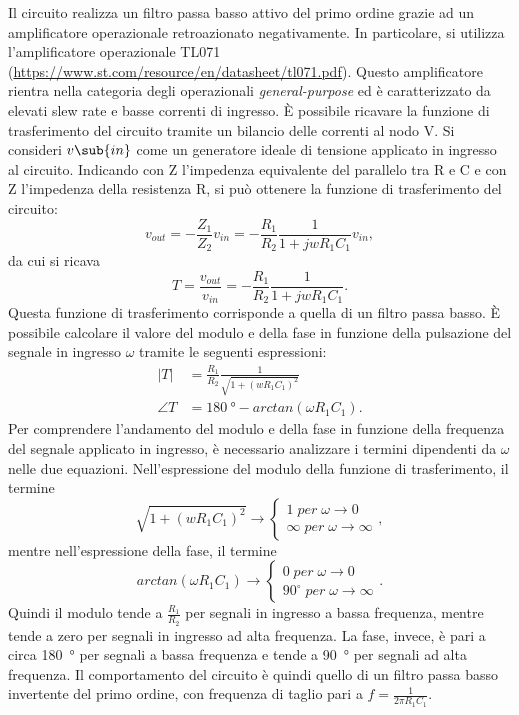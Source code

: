 \noindent
Il circuito realizza un filtro passa basso attivo del primo ordine grazie ad un amplificatore operazionale retroazionato negativamente. In particolare, si utilizza l'amplificatore operazionale TL071 (\url{https://www.st.com/resource/en/datasheet/tl071.pdf}). Questo amplificatore rientra nella categoria degli operazionali \textit{general-purpose} ed è caratterizzato da elevati slew rate e basse correnti di ingresso.
\`E possibile ricavare la funzione di trasferimento del circuito tramite un bilancio delle correnti al nodo V\super{-}. Si consideri $v\sub{in}$ come un generatore ideale di tensione applicato in ingresso al circuito. Indicando con Z l'impedenza equivalente del parallelo tra R e C e con Z l'impedenza della resistenza R, si può ottenere la funzione di trasferimento del circuito:
\begin{equation}
	v_{out}=-\frac{Z_1}{Z_2}v_{in}=-\frac{R_1}{R_2}\frac{1}{1+j w R_1 C_1} v_{in},
\end{equation}
da cui si ricava
\begin{equation}
	T=\frac{v_{out}}{v_{in}}=-\frac{R_1}{R_2}\frac{1}{1+j w R_1 C_1}.
\end{equation}
Questa funzione di trasferimento corrisponde a quella di un filtro passa basso. È possibile calcolare il valore del modulo e della fase in funzione della pulsazione del segnale in ingresso $\omega$ tramite le seguenti espressioni:
\begin{equation}
	\begin{split}
		|T|&=\frac{R_1}{R_2}\frac{1}{\sqrt{1+(wR_1C_1)^2}} \\
		\angle T&=\SI{180}{\degree}-arctan(\omega R_1 C_1).
	\end{split}
	\label{eq:1.3}
\end{equation}
Per comprendere l'andamento del modulo e della fase in funzione della frequenza del segnale applicato in ingresso, è necessario analizzare i termini dipendenti da $\omega$ nelle due equazioni. Nell'espressione del modulo della funzione di trasferimento, il termine 
\begin{equation}
	\sqrt{1+(wR_1C_1)^2} \to
	\begin{cases}
		1 \; per \; \omega \to 0 \\
		\infty \; per \; \omega \to \infty
	\end{cases}
,
\end{equation}
mentre nell'espressione della fase, il termine
\begin{equation}
	arctan(\omega R_1 C_1) \to
	\begin{cases}
		0 \; per \; \omega \to 0 \\
		90^\circ \; per \; \omega \to \infty
	\end{cases}
	.
\end{equation}
Quindi il modulo tende a $\frac{R_1}{R_2}$ per segnali in ingresso a bassa frequenza, mentre tende a zero per segnali in ingresso ad alta frequenza. La fase, invece, è pari a circa \SI{180}{\degree} per segnali a bassa frequenza e tende a \SI{90}{\degree} per segnali ad alta frequenza.
Il comportamento del circuito è quindi quello di un filtro passa basso invertente del primo ordine, con frequenza di taglio pari a $f=\frac{1}{2\pi R_1C_1}$.

